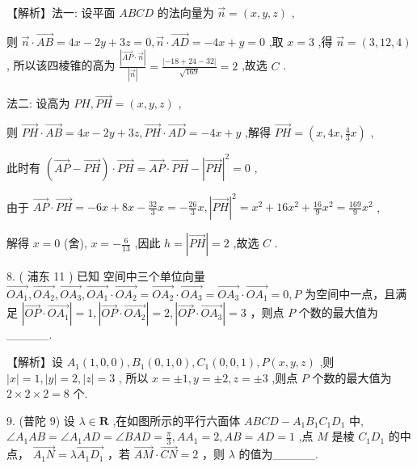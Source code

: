 \documentclass[10pt]{article}
\begin{document}
【解析】法一: 设平面 \({ABCD}\) 的法向量为 \(\overrightarrow{n} = \left( {x,y,z}\right)\) ,

则 \(\overrightarrow{n} \cdot  \overrightarrow{AB} = {4x} - {2y} + {3z} = 0,\overrightarrow{n} \cdot  \overrightarrow{AD} =  - {4x} + y = 0\) ,取 \(x = 3\) ,得 \(\overrightarrow{n} = \left( {3,{12},4}\right)\) , 所以该四棱锥的高为 \(\frac{\left| \overrightarrow{AP} \cdot  \overrightarrow{n}\right| }{\left| \overrightarrow{n}\right| } = \frac{\left| -{18} + {24} - {32}\right| }{\sqrt{169}} = 2\) ,故选 \(C\) .

法二: 设高为 \({PH},\overrightarrow{PH} = \left( {x,y,z}\right)\) ,

则 \(\overrightarrow{PH} \cdot  \overrightarrow{AB} = {4x} - {2y} + {3z},\overrightarrow{PH} \cdot  \overrightarrow{AD} =  - {4x} + y\) ,解得 \(\overrightarrow{PH} = \left( {x,{4x},\frac{4}{3}x}\right)\) ,

此时有 \(\left( {\overrightarrow{AP} - \overrightarrow{PH}}\right)  \cdot  \overrightarrow{PH} = \overrightarrow{AP} \cdot  \overrightarrow{PH} - {\left| \overrightarrow{PH}\right| }^{2} = 0\) ,

由于 \(\overrightarrow{AP} \cdot  \overrightarrow{PH} =  - {6x} + {8x} - \frac{32}{3}x =  - \frac{26}{3}x,{\left| \overrightarrow{PH}\right| }^{2} = {x}^{2} + {16}{x}^{2} + \frac{16}{9}{x}^{2} = \frac{169}{9}{x}^{2}\) ,

解得 \(x = 0\) (舍), \(x =  - \frac{6}{13}\) ,因此 \(h = \left| \overrightarrow{PH}\right|  = 2\) ,故选 \(C\) .

8. ( 浦东 11 ) 已知 空间中三个单位向量 \(\overrightarrow{O{A}_{1}},\overrightarrow{O{A}_{2}},\overrightarrow{O{A}_{3}},\overrightarrow{O{A}_{1}} \cdot  \overrightarrow{O{A}_{2}} = \overrightarrow{O{A}_{2}} \cdot  \overrightarrow{O{A}_{3}} = \overrightarrow{O{A}_{3}} \cdot  \overrightarrow{O{A}_{1}} = 0,P\) 为空间中一点，且满足 \(\left| {\overrightarrow{OP} \cdot  \overrightarrow{O{A}_{1}}}\right|  = 1,\left| {\overrightarrow{OP} \cdot  \overrightarrow{O{A}_{2}}}\right|  = 2,\left| {\overrightarrow{OP} \cdot  \overrightarrow{O{A}_{3}}}\right|  = 3\) ，则点 \(P\) 个数的最大值为\_\_\_\_\_.

【解析】设 \({A}_{1}\left( {1,0,0}\right) ,{B}_{1}\left( {0,1,0}\right) ,{C}_{1}\left( {0,0,1}\right) ,P\left( {x,y,z}\right)\) ,则 \(\left| x\right|  = 1,\left| y\right|  = 2,\left| z\right|  = 3\) , 所以 \(x =  \pm  1,y =  \pm  2,z =  \pm  3\) ,则点 \(P\) 个数的最大值为 \(2 \times  2 \times  2 = 8\) 个.

9. (普陀 9) 设 \(\lambda  \in  \mathbf{R}\) ,在如图所示的平行六面体 \({ABCD} - {A}_{1}{B}_{1}{C}_{1}{D}_{1}\) 中, \(\angle {A}_{1}{AB} = \angle {A}_{1}{AD} = \angle {BAD} = \frac{\pi }{3},A{A}_{1} = 2,{AB} = {AD} = 1\) ,点 \(M\) 是棱 \({C}_{1}{D}_{1}\) 的中点， \(\overrightarrow{{A}_{1}N} = \lambda \overrightarrow{{A}_{1}{D}_{1}}\) ，若 \(\overrightarrow{AM} \cdot  \overrightarrow{CN} = 2\) ，则 \(\lambda\) 的值为\_\_\_\_\_.
\end{document}

